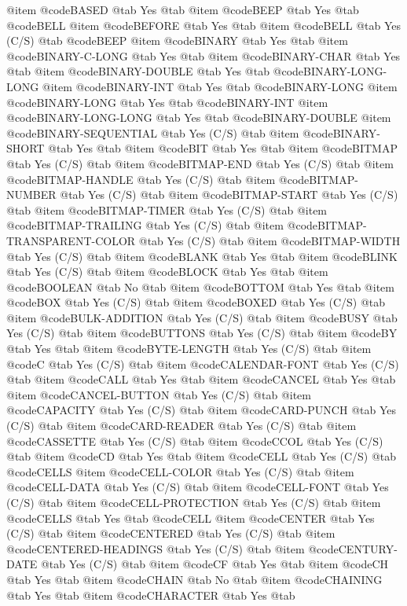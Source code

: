 @item @code{BASED} @tab Yes @tab 
@item @code{BEEP} @tab Yes @tab @code{BELL}
@item @code{BEFORE} @tab Yes @tab 
@item @code{BELL} @tab Yes	(C/S) @tab @code{BEEP}
@item @code{BINARY} @tab Yes @tab 
@item @code{BINARY-C-LONG} @tab Yes @tab 
@item @code{BINARY-CHAR} @tab Yes @tab 
@item @code{BINARY-DOUBLE} @tab Yes @tab @code{BINARY-LONG-LONG}
@item @code{BINARY-INT} @tab Yes @tab @code{BINARY-LONG}
@item @code{BINARY-LONG} @tab Yes @tab @code{BINARY-INT}
@item @code{BINARY-LONG-LONG} @tab Yes @tab @code{BINARY-DOUBLE}
@item @code{BINARY-SEQUENTIAL} @tab Yes	(C/S) @tab 
@item @code{BINARY-SHORT} @tab Yes @tab 
@item @code{BIT} @tab Yes @tab 
@item @code{BITMAP} @tab Yes	(C/S) @tab 
@item @code{BITMAP-END} @tab Yes	(C/S) @tab 
@item @code{BITMAP-HANDLE} @tab Yes	(C/S) @tab 
@item @code{BITMAP-NUMBER} @tab Yes	(C/S) @tab 
@item @code{BITMAP-START} @tab Yes	(C/S) @tab 
@item @code{BITMAP-TIMER} @tab Yes	(C/S) @tab 
@item @code{BITMAP-TRAILING} @tab Yes	(C/S) @tab 
@item @code{BITMAP-TRANSPARENT-COLOR} @tab Yes	(C/S) @tab 
@item @code{BITMAP-WIDTH} @tab Yes	(C/S) @tab 
@item @code{BLANK} @tab Yes @tab 
@item @code{BLINK} @tab Yes	(C/S) @tab 
@item @code{BLOCK} @tab Yes @tab 
@item @code{BOOLEAN} @tab No @tab 
@item @code{BOTTOM} @tab Yes @tab 
@item @code{BOX} @tab Yes	(C/S) @tab 
@item @code{BOXED} @tab Yes	(C/S) @tab 
@item @code{BULK-ADDITION} @tab Yes	(C/S) @tab 
@item @code{BUSY} @tab Yes	(C/S) @tab 
@item @code{BUTTONS} @tab Yes	(C/S) @tab 
@item @code{BY} @tab Yes @tab 
@item @code{BYTE-LENGTH} @tab Yes	(C/S) @tab 
@item @code{C} @tab Yes	(C/S) @tab 
@item @code{CALENDAR-FONT} @tab Yes	(C/S) @tab 
@item @code{CALL} @tab Yes @tab 
@item @code{CANCEL} @tab Yes @tab 
@item @code{CANCEL-BUTTON} @tab Yes	(C/S) @tab 
@item @code{CAPACITY} @tab Yes	(C/S) @tab 
@item @code{CARD-PUNCH} @tab Yes	(C/S) @tab 
@item @code{CARD-READER} @tab Yes	(C/S) @tab 
@item @code{CASSETTE} @tab Yes	(C/S) @tab 
@item @code{CCOL} @tab Yes	(C/S) @tab 
@item @code{CD} @tab Yes @tab 
@item @code{CELL} @tab Yes	(C/S) @tab @code{CELLS}
@item @code{CELL-COLOR} @tab Yes	(C/S) @tab 
@item @code{CELL-DATA} @tab Yes	(C/S) @tab 
@item @code{CELL-FONT} @tab Yes	(C/S) @tab 
@item @code{CELL-PROTECTION} @tab Yes	(C/S) @tab 
@item @code{CELLS} @tab Yes @tab @code{CELL}
@item @code{CENTER} @tab Yes	(C/S) @tab 
@item @code{CENTERED} @tab Yes	(C/S) @tab 
@item @code{CENTERED-HEADINGS} @tab Yes	(C/S) @tab 
@item @code{CENTURY-DATE} @tab Yes	(C/S) @tab 
@item @code{CF} @tab Yes @tab 
@item @code{CH} @tab Yes @tab 
@item @code{CHAIN} @tab No @tab 
@item @code{CHAINING} @tab Yes @tab 
@item @code{CHARACTER} @tab Yes @tab 
